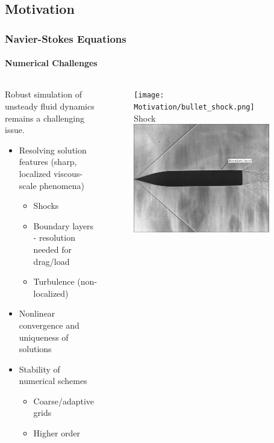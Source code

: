 \documentclass[18pt,xcolor=table]{beamer}
\begin{document}
\subsection{Motivation}
\begin{frame}[t]
\frametitle{Navier-Stokes Equations}
\framesubtitle{Numerical Challenges}
\begin{columns}[c]
\begin{column}{.6\textwidth}
Robust simulation of unsteady fluid dynamics remains a challenging issue.
\vspace{2ex}

\begin{itemize}
\item{} Resolving solution features (sharp, localized viscous-scale phenomena)
\begin{itemize}
\item{} Shocks
\item{} Boundary layers - resolution needed for drag/load
\item{} Turbulence (non-localized)
\end{itemize}
\item{} Nonlinear convergence and uniqueness of solutions
\item{} Stability of numerical schemes
\begin{itemize}
\item{} Coarse/adaptive grids
\item{} Higher order
\end{itemize}
\end{itemize}
\vspace{-3ex}
\end{column}
\begin{column}{.4\textwidth}
\vspace{-3ex}
\begin{figure}
\centering
\texttt{[image: Motivation/bullet\_shock.png]}\\
Shock\\\vspace{1ex}
\includegraphics[width=0.9\textwidth]{Motivation/boundary_layer.png}\\

\end{figure}
\end{column}
\end{columns}
\end{frame}
\end{document}
